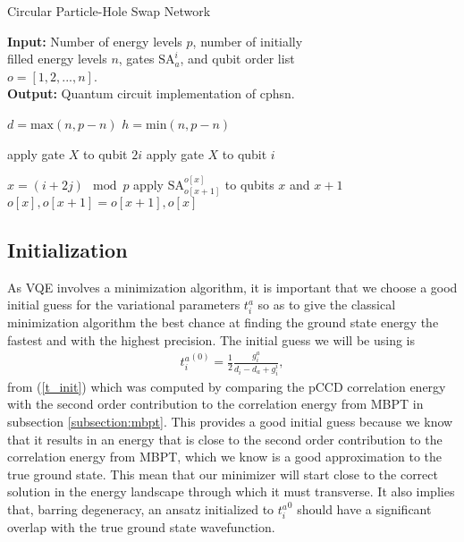 \documentclass[Dual]{msu-thesis}
\begin{document}
\begin{algorithm}[H]

\caption{Circular Particle-Hole Swap Network}\label{lphsn}

\hspace*{\algorithmicindent} \textbf{Input:} Number of energy levels $p$, number of initially 
\\
\hspace*{\algorithmicindent} filled energy levels $n$, gates $\text{SA}^i_a$, and qubit order list 
\\
\hspace*{\algorithmicindent} $o=[1,2,...,n]$.
\\
\hspace*{\algorithmicindent} \textbf{Output:} Quantum circuit implementation of cphsn.

\begin{algorithmic}[H]

\State $d = \text{max}(n,p-n)$ 
\State $h = \text{min}(n,p-n)$ 

    \State apply gate $X$ to qubit $2i$
\EndFor
{}
    \State apply gate $X$ to qubit $i$
    \EndFor
\EndIf

        \State $x=(i+2j) \mod{p}$
        \State apply $\text{SA}^{o[x]}_{o[x+1]}$ to qubits $x$ and $x+1$
        \State $o[x], o[x+1] = o[x+1], o[x]$
    \EndFor
\EndFor

\end{algorithmic}

\end{algorithm}

\subsection{Initialization}

As VQE involves a minimization algorithm, it is important that we choose a good initial guess for the variational parameters $t^a_i$ so as to give the classical minimization algorithm the best chance at finding the ground state energy the fastest and with the highest precision. The initial guess we will be using is 
\begin{align}
\label{t_init_copy}
{t^a_i}^{(0)}
=
\frac{1}{2}\frac{g^a_i}{d_i-d_a+g^i_i},
\end{align}
from (\ref{t_init}) which was computed by comparing the pCCD correlation energy with the second order contribution to the correlation energy from MBPT in subsection \ref{subsection:mbpt}. This provides a good initial guess because we know that it results in an energy that is close to the second order contribution to the correlation energy from MBPT, which we know is a good approximation to the true ground state. This mean that our minimizer will start close to the correct solution in the energy landscape through which it must transverse. It also implies that, barring degeneracy, an ansatz initialized to ${t^a_i}^{0}$ should have a significant overlap with the true ground state wavefunction.
\end{document}
